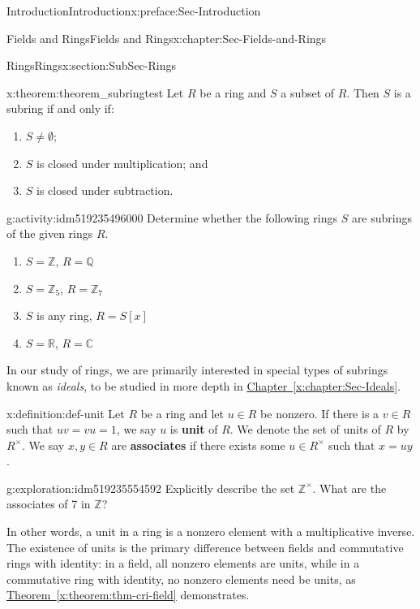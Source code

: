 \documentclass[oneside,10pt,]{book}
\newcommand{\xreffont}{\relax}
\newcommand{\terminology}[1]{\textbf{#1}}
\numberwithin{equation}{section}
\def\C{{\mathbb C}}
\def\Z{{\mathbb Z}}
\def\Q{{\mathbb Q}}
\def\R{{\mathbb R}}
\begin{document}
\begin{preface}{Introduction}{}{Introduction}{}{}{x:preface:Sec-Introduction}
\begin{chapterptx}{Fields and Rings}{}{Fields and Rings}{}{}{x:chapter:Sec-Fields-and-Rings}
\begin{sectionptx}{Rings}{}{Rings}{}{}{x:section:SubSec-Rings}
\begin{theorem}{}{}{x:theorem:theorem_subringtest}%
%
Let \(R\) be a ring and \(S\) a subset of \(R\). Then \(S\) is a subring if and only if:%
\begin{enumerate}
\item{}\(S\ne \emptyset\);%
\item{}\(S\) is closed under multiplication; and%
\item{}\(S\) is closed under subtraction.%
\end{enumerate}
%
\end{theorem}
\begin{activity}{}{g:activity:idm519235496000}%
Determine whether the following rings \(S\) are subrings of the given rings \(R\).%
\begin{enumerate}
\item{}\(S = \Z\), \(R = \Q\)%
\item{}\(S = \Z_{5}\), \(R = \Z_{7}\)%
\item{}\(S\) is any ring, \(R = S[x]\)%
\item{}\(S = \R\), \(R = \C\)%
\end{enumerate}
%
\end{activity}
In our study of rings, we are primarily interested in special types of subrings known as \emph{ideals}, to be studied in more depth in \hyperref[x:chapter:Sec-Ideals]{Chapter~{\xreffont\ref{x:chapter:Sec-Ideals}}}.%
\begin{definition}{}{x:definition:def-unit}%
%
%
Let \(R\) be a ring and let \(u\in R\) be nonzero. If there is a \(v\in R\) such that \(uv = vu = 1\), we say \(u\) is \terminology{unit} of \(R\). We denote the set of units of \(R\) by \(R^\times\). We say \(x,y\in R\) are \terminology{associates} if there exists some \(u\in R^\times\) such that \(x = uy\).%
\end{definition}
\begin{exploration}{}{g:exploration:idm519235554592}%
Explicitly describe the set \(\Z^\times\). What are the associates of 7 in \(\Z\)?%
\end{exploration}
In other words, a unit in a ring is a nonzero element with a multiplicative inverse. The existence of units is the primary difference between fields and commutative rings with identity: in a field, all nonzero elements are units, while in a commutative ring with identity, no nonzero elements need be units, as \hyperref[x:theorem:thm-cri-field]{Theorem~{\xreffont\ref{x:theorem:thm-cri-field}}} demonstrates.%

\end{sectionptx}
\end{chapterptx}
\end{preface}
\end{document}
